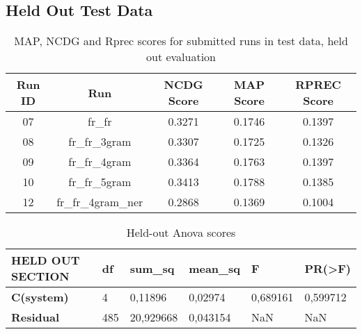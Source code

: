 \subsection{Held Out Test Data}\label{subsec:held_out}
\begin{table}[h!]
    \begin{center}
        \caption{MAP, NCDG and Rprec scores for submitted runs in test data, held out evaluation}
        \label{tab:heldOut_scores}
        \begin{tabular}{|c|c||c|c|c|}
            \hline
            \textbf{Run ID} & \textbf{Run} & \textbf{NCDG Score} & \textbf{MAP Score} & \textbf{RPREC Score}\\
            \hline\hline
            07 & fr\_fr & 0.3271 & 0.1746 & 0.1397 \\
            \hline
            08 & fr\_fr\_3gram & 0.3307 & 0.1725 & 0.1326 \\
            \hline
            09 & fr\_fr\_4gram & 0.3364 & 0.1763 & 0.1397 \\
            \hline
            10 & fr\_fr\_5gram & 0.3413 & 0.1788 & 0.1385 \\
            \hline
            12 & fr\_fr\_4gram\_ner & 0.2868 & 0.1369 & 0.1004 \\
            \hline
        \end{tabular}
    \end{center}
\end{table}
\begin{table}[h!]
    \centering
    \caption{Held-out Anova scores}
    \begin{tabular}{|l|l|l|l|l|l|}
    \hline
        \textbf{HELD OUT SECTION} & \textbf{df} & \textbf{sum\_sq} & \textbf{mean\_sq} & \textbf{F} & \textbf{PR(>F)} \\ \hline\hline
        \textbf{C(system)} & 4 & 0,11896 & 0,02974 & 0,689161 & 0,599712 \\ \hline
        \textbf{Residual} & 485 & 20,929668 & 0,043154 & NaN & NaN \\ \hline
    \end{tabular}
    \label{HeldOut_Anova}
\end{table}

